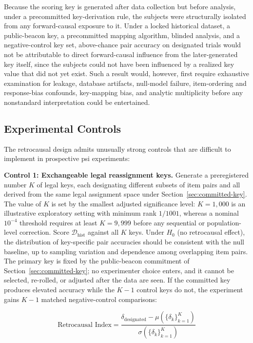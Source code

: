 \documentclass[11pt,letterpaper]{article}
\begin{document}
Because the scoring key is generated after data collection but before analysis, under a precommitted key-derivation rule, the subjects were structurally isolated from any forward-causal exposure to it. Under a locked historical dataset, a public-beacon key, a precommitted mapping algorithm, blinded analysis, and a negative-control key set, above-chance pair accuracy on designated trials would not be attributable to direct forward-causal influence from the later-generated key itself, since the subjects could not have been influenced by a realized key value that did not yet exist. Such a result would, however, first require exhaustive examination for leakage, database artifacts, null-model failure, item-ordering and response-bias confounds, key-mapping bias, and analytic multiplicity before any nonstandard interpretation could be entertained.


\subsection{Experimental Controls}

The retrocausal design admits unusually strong controls that are difficult to implement in prospective psi experiments:

\textbf{Control 1: Exchangeable legal reassignment keys.} Generate a preregistered number $K$ of legal keys, each designating different subsets of item pairs and all derived from the same legal assignment space under Section~\ref{sec:committed-key}. The value of $K$ is set by the smallest adjusted significance level: $K=1{,}000$ is an illustrative exploratory setting with minimum rank $1/1001$, whereas a nominal $10^{-4}$ threshold requires at least $K=9{,}999$ before any sequential or population-level correction. Score $\mathcal{D}_{\text{hist}}$ against all $K$ keys. Under $H_0$ (no retrocausal effect), the distribution of key-specific pair accuracies should be consistent with the null baseline, up to sampling variation and dependence among overlapping item pairs. The primary key is fixed by the public-beacon commitment of Section~\ref{sec:committed-key}; no experimenter choice enters, and it cannot be selected, re-rolled, or adjusted after the data are seen. If the committed key produces elevated accuracy while the $K - 1$ control keys do not, the experiment gains $K - 1$ matched negative-control comparisons:

\begin{equation}
\text{Retrocausal Index} = \frac{\delta_{\text{designated}} - \mu(\{\delta_k\}_{k=1}^{K})}{\sigma(\{\delta_k\}_{k=1}^{K})}
\label{eq:retro}
\end{equation}
\end{document}
